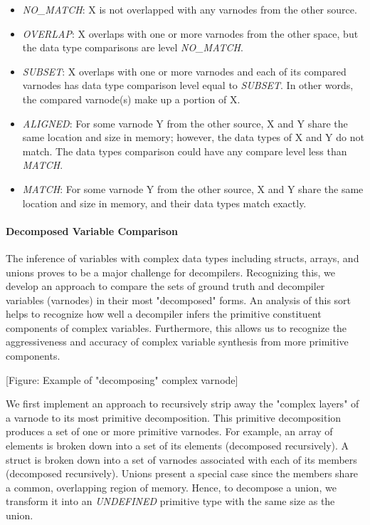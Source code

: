 \documentclass[conference]{IEEEtran}
\begin{document}
\begin{itemize}
    \item \emph{NO\_MATCH}: X is not overlapped with any varnodes from the other source.
    \item \emph{OVERLAP}: X overlaps with one or more varnodes from the other space, but the data type comparisons are level \emph{NO\_MATCH}.
    \item \emph{SUBSET}: X overlaps with one or more varnodes and each of its compared varnodes has data type comparison level equal to \emph{SUBSET}. In other words, the compared varnode(s) make up a portion of X.
    \item \emph{ALIGNED}: For some varnode Y from the other source, X and Y share the same location and size in memory; however, the data types of X and Y do not match. The data types comparison could have any compare level less than \emph{MATCH}.
    \item \emph{MATCH}: For some varnode Y from the other source, X and Y share the same location and size in memory, and their data types match exactly.
\end{itemize}

\paragraph{Decomposed Variable Comparison}

The inference of variables with complex data types including structs, arrays, and unions proves to be a major challenge for decompilers. Recognizing this, we develop an approach to compare the sets of ground truth and decompiler variables (varnodes) in their most "decomposed" forms. An analysis of this sort helps to recognize how well a decompiler infers the primitive constituent components of complex variables. Furthermore, this allows us to recognize the aggressiveness and accuracy of complex variable synthesis from more primitive components.

[Figure: Example of "decomposing" complex varnode]

We first implement an approach to recursively strip away the "complex layers" of a varnode to its most primitive decomposition. This primitive decomposition produces a set of one or more primitive varnodes. For example, an array of elements is broken down into a set of its elements (decomposed recursively). A struct is broken down into a set of varnodes associated with each of its members (decomposed recursively). Unions present a special case since the members share a common, overlapping region of memory. Hence, to decompose a union, we transform it into an \emph{UNDEFINED} primitive type with the same size as the union.
\end{document}
